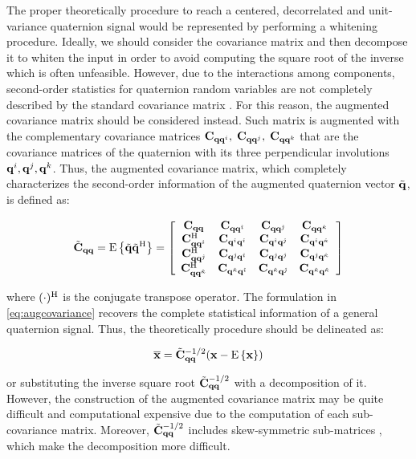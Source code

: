 \documentclass[graybox]{svmult}
\begin{document}
The proper theoretically procedure to reach a centered, decorrelated and unit-variance quaternion signal would be represented by performing a whitening procedure. Ideally, we should consider the covariance matrix and then decompose it to whiten the input in order to avoid computing the square root of the inverse which is often unfeasible. However, due to the interactions among components, second-order statistics for quaternion random variables are not completely described by the standard covariance matrix \cite{TookSIGPRO2011}. For this reason, the augmented covariance matrix should be considered instead. Such matrix is augmented with the complementary covariance matrices ${\mathbf C}_{{\mathbf q}{\mathbf q}^i}, \; {\mathbf C}_{{\mathbf q}{\mathbf q}^j}, \; {\mathbf C}_{{\mathbf q}{\mathbf q}^k}$ that are the covariance matrices of the quaternion with its three perpendicular involutions ${\mathbf q}^i, {\mathbf q}^j, {\mathbf q}^k$. Thus, the augmented covariance matrix, which completely characterizes the second-order information of the augmented quaternion vector $\tilde{{\mathbf q}}$, is defined as:

\begin{equation}
	\tilde{\C}_{\q\q} = \E\left\{\tilde{\q}\tilde{\q}\tH\right\} 
	= \left[{\begin{array}{*{20}c} {{\C}_{\q\q}} & {{\C}_{\q\q^\ii}} & {{\C}_{\q\q^\ij}} & {{\C}_{\q\q^\ik}}\\
	{{\C}_{\q\q^\ii}\tH} & {{\C}_{\q^\ii \q^\ii}} & {{\C}_{\q^\ii \q^\ij}} & {{\C}_{\q^\ii \q^\ik}}\\
	{{\C}_{\q\q^\ij}\tH} & {{\C}_{\q^\ij \q^\ii}} & {{\C}_{\q^\ij \q^\ij}} & {{\C}_{\q^\ij \q^\ik}}\\
	{{\C}_{\q\q^\ik}\tH} & {{\C}_{\q^\ik \q^\ii}} & {{\C}_{\q^\ik \q^\ij}} & {{\C}_{\q^\ik \q^\ik}}\\
	\end{array}} \right]
	\label{eq:augcovariance}
\end{equation}

\noindent where $(\cdot)^{\text{H}}$ is the conjugate transpose operator. The formulation in \eqref{eq:augcovariance} recovers the complete statistical information of a general quaternion signal. Thus, the theoretically procedure should be delineated as:

\begin{equation}
    \overline{\mathbf{x}} = \tilde{{\mathbf C}}_{{\mathbf q}{\mathbf q}}^{-1/2}(\mathbf{x} - \text{E}\left\{\mathbf{x}\right\})
\end{equation}

\noindent or substituting the inverse square root $\tilde{{\mathbf C}}_{{\mathbf q}{\mathbf q}}^{-1/2}$ with a decomposition of it. However, the construction of the augmented covariance matrix may be quite difficult and computational expensive due to the computation of each sub-covariance matrix. Moreover, $\tilde{{\mathbf C}}_{{\mathbf q}{\mathbf q}}^{-1/2}$ includes skew-symmetric sub-matrices \cite{TookSIGPRO2011}, which make the decomposition more difficult.
\end{document}

